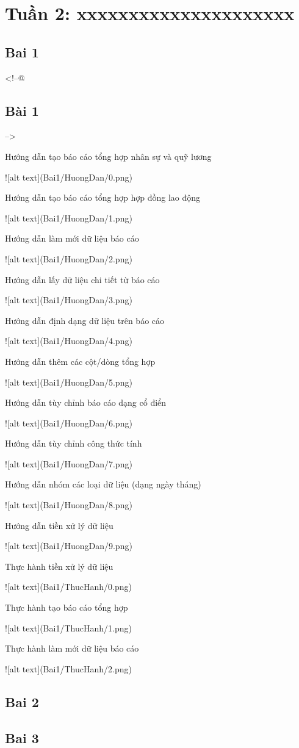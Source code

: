 \documentclass{article}
\begin{document}
\tableofcontents
\newpage
\listoffigures
\newpage
\section{Tuần 2: xxxxxxxxxxxxxxxxxxxxx}






\subsection{Bai 1}
<!--@ \subsection{Bài 1} -->

\caption{Hướng dẫn tạo báo cáo tổng hợp nhân sự và quỹ lương }
![alt text](Bai1/HuongDan/0.png)
\caption{Hướng dẫn tạo báo cáo tổng hợp hợp đồng lao động }
![alt text](Bai1/HuongDan/1.png)
\caption{Hướng dẫn làm mới dữ liệu báo cáo }
![alt text](Bai1/HuongDan/2.png)
\caption{Hướng dẫn lấy dữ liệu chi tiết từ báo cáo }
![alt text](Bai1/HuongDan/3.png)
\caption{Hướng dẫn định dạng dữ liệu trên báo cáo }
![alt text](Bai1/HuongDan/4.png)
\caption{Hướng dẫn thêm các cột/dòng tổng hợp }
![alt text](Bai1/HuongDan/5.png)
\caption{Hướng dẫn tùy chỉnh báo cáo dạng cổ điển}
![alt text](Bai1/HuongDan/6.png)
\caption{Hướng dẫn tùy chỉnh công thức tính }
![alt text](Bai1/HuongDan/7.png)
\caption{Hướng dẫn nhóm các loại dữ liệu (dạng ngày tháng)}
![alt text](Bai1/HuongDan/8.png)
\caption{Hướng dẫn tiền xử lý dữ liệu}
![alt text](Bai1/HuongDan/9.png)

\caption{Thực hành             tiền xử lý dữ liệu}
![alt text](Bai1/ThucHanh/0.png)
\caption{Thực hành             tạo báo cáo tổng hợp }
![alt text](Bai1/ThucHanh/1.png)
\caption{Thực hành             làm mới dữ liệu báo cáo }
![alt text](Bai1/ThucHanh/2.png)
\subsection{Bai 2}

\subsection{Bai 3}



\end{document}
